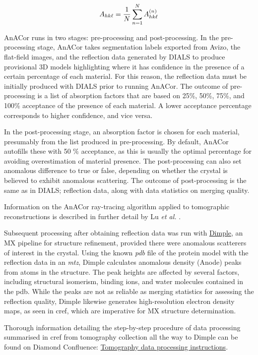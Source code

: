 \begin{equation}
    A_{hk\ell} = \frac{1}{N} \sum_{n=1}^N A_{hk\ell}^{(n)}
\end{equation}

AnACor runs in two stages: pre-processing and post-processing. In the pre-processing stage, AnACor takes segmentation labels exported from Avizo, the flat-field images, and the reflection data generated by DIALS to produce provisional 3D models highlighting where it has confidence in the presence of a certain percentage of each material. For this reason, the reflection data must be initially produced with DIALS prior to running AnACor. The outcome of pre-processing is a list of absorption factors that are based on 25\%, 50\%, 75\%, and 100\% acceptance of the presence of each material. A lower acceptance percentage corresponds to higher confidence, and vice versa.

In the post-processing stage, an absorption factor is chosen for each material, presumably from the list produced in pre-processing. By default, AnACor autofills these with 50 \% acceptance, as this is usually the optimal percentage for avoiding overestimation of material presence. The post-processing can also set anomalous difference to true or false, depending on whether the crystal is believed to exhibit anomalous scattering. The outcome of post-processing is the same as in DIALS; reflection data, along with data statistics on merging quality.

Information on the AnACor ray-tracing algorithm applied to tomographic reconstructions is described in further detail by Lu \textit{et al.} \cite{LuSubmitted}.

Subsequent processing after obtaining reflection data was run with \href{http://ccp4.github.io/dimple}{Dimple}, an MX pipeline for structure refinement, provided there were anomalous scatterers of interest in the crystal. Using the known \textit{pdb} file of the protein model with the reflection data in an \textit{mtz}, Dimple calculates anomalous density (Anode) peaks from atoms in the structure. The peak heights are affected by several factors, including structural isomerism, binding ions, and water molecules contained in the pdb. While the peaks are not as reliable as merging statistics for assessing the reflection quality, Dimple likewise generates high-resolution electron density maps, as seen in cref{}, which are imperative for MX structure determination.

Thorough information detailing the step-by-step procedure of data processing summarised in cref{} from tomography collection all the way to Dimple can be found on Diamond Confluence: \href{https://confluence.diamond.ac.uk/x/yIWuD}{Tomography data processing instructions}.

